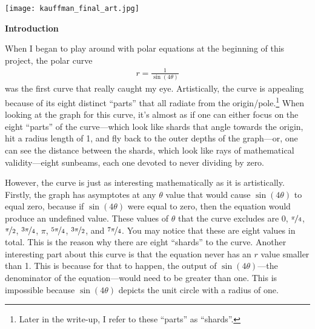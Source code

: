 
\texttt{[image: kauffman\_final\_art.jpg]}

\noindent
\textbf{Introduction}

When I began to play around with polar equations at the beginning of this project, the polar curve
\begin{align*}
    r = \frac{1}{\sin(4\theta)}
\end{align*}
was the first curve that really caught my eye. Artistically, the curve is appealing because of its eight distinct ``parts'' that all radiate from the origin/pole.\footnote{Later in the write-up, I refer to these ``parts'' as ``shards''.} When looking at the graph for this curve, it’s almost as if one can either focus on the eight ``parts'' of the curve---which look like shards that angle towards the origin, hit a radius length of 1, and fly back to the outer depths of the graph---or, one can see the distance between the shards, which look like rays of mathematical validity---eight sunbeams, each one devoted to never dividing by zero.

However, the curve is just as interesting mathematically as it is artistically. Firstly, the graph has asymptotes at any $\theta$ value that would cause $\sin(4\theta)$ to equal zero, because if $\sin(4\theta)$ were equal to zero, then the equation would produce an undefined value. These values of $\theta$ that the curve excludes are $0$, $\nicefrac{\pi}{4}$, $\nicefrac{\pi}{2}$, $\nicefrac{3\pi}{4}$, $\pi$, $\nicefrac{5\pi}{4}$, $\nicefrac{3\pi}{2}$, and $\nicefrac{7\pi}{4}$. You may notice that these are eight values in total. This is the reason why there are eight ``shards'' to the curve. Another interesting part about this curve is that the equation never has an $r$ value smaller than 1. This is because for that to happen, the output of $\sin(4\theta)$---the denominator of the equation---would need to be greater than one. This is impossible because $\sin(4\theta)$ depicts the unit circle with a radius of one.

